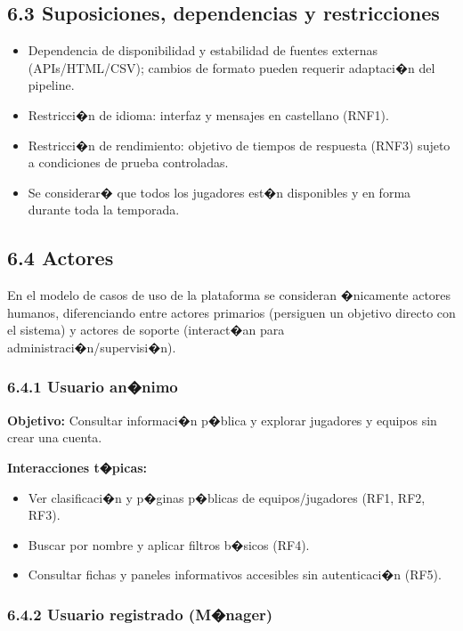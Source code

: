 \subsection{6.3 Suposiciones, dependencias y restricciones}

\begin{itemize}
  \item Dependencia de disponibilidad y estabilidad de fuentes externas (APIs/HTML/CSV); cambios de 
  formato pueden requerir adaptaci�n del pipeline.
  \item Restricci�n de idioma: interfaz y mensajes en castellano (RNF1).
  \item Restricci�n de rendimiento: objetivo de tiempos de respuesta (RNF3) sujeto a condiciones de 
  prueba controladas.
  \item Se considerar� que todos los jugadores est�n disponibles y en forma durante toda la temporada.
\end{itemize}

\subsection{6.4 Actores}

En el modelo de casos de uso de la plataforma se consideran �nicamente actores humanos, diferenciando 
entre actores primarios (persiguen un objetivo directo con el sistema) y actores de soporte (interact�an 
para administraci�n/supervisi�n).

\subsubsection{6.4.1 Usuario an�nimo}

\textbf{Objetivo:} Consultar informaci�n p�blica y explorar jugadores y equipos sin crear una cuenta.

\textbf{Interacciones t�picas:}
\begin{itemize}
  \item Ver clasificaci�n y p�ginas p�blicas de equipos/jugadores (RF1, RF2, RF3).
  \item Buscar por nombre y aplicar filtros b�sicos (RF4).
  \item Consultar fichas y paneles informativos accesibles sin autenticaci�n (RF5).
\end{itemize}

\subsubsection{6.4.2 Usuario registrado (M�nager)}

